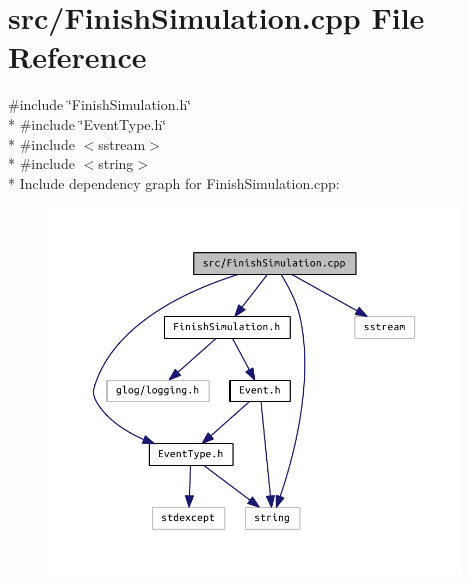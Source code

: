 \section{src/\+Finish\+Simulation.cpp File Reference}
\label{_finish_simulation_8cpp}
{\ttfamily \#include \char`\"{}Finish\+Simulation.\+h\char`\"{}}\\*
{\ttfamily \#include \char`\"{}Event\+Type.\+h\char`\"{}}\\*
{\ttfamily \#include $<$sstream$>$}\\*
{\ttfamily \#include $<$string$>$}\\*
Include dependency graph for Finish\+Simulation.\+cpp\+:\nopagebreak
\begin{figure}[H]
\begin{center}
\leavevmode
\includegraphics[width=310pt]{_finish_simulation_8cpp__incl}
\end{center}
\end{figure}

